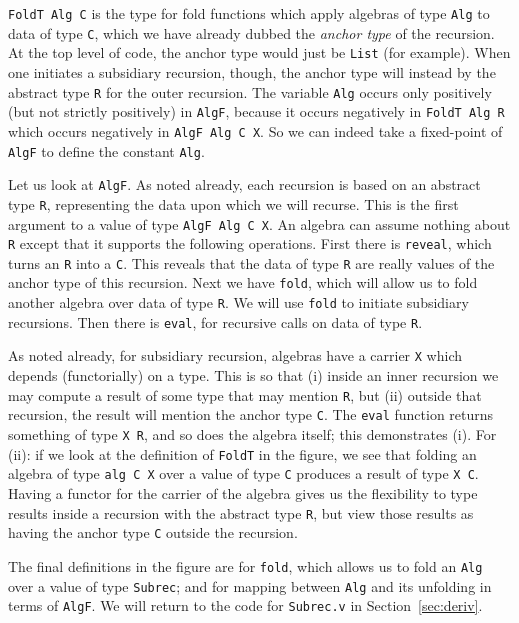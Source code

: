 \documentclass[a4paper,USenglish]{lipics-v2021}
\begin{document}
\verb|FoldT Alg C| is the type for fold functions which apply
algebras of type \verb|Alg| to data of type \verb|C|, which we have
already dubbed the \emph{anchor type} of the recursion.  At the top
level of code, the anchor type would just be \verb|List| (for
example).  When one initiates a subsidiary recursion, though, the
anchor type will instead by the abstract type \verb|R| for the outer recursion.
The variable \verb|Alg| occurs only positively (but not strictly
positively) in \verb|AlgF|, because it occurs negatively in
\verb|FoldT Alg R| which occurs negatively in \verb|AlgF Alg C X|.  So
we can indeed take a fixed-point of \verb|AlgF| to define the constant
\verb|Alg|.

Let us look at \verb|AlgF|.  As noted already, each recursion is based
on an abstract type \verb|R|, representing the data upon which we will
recurse.  This is the first argument to a value of type
\verb|AlgF Alg C X|.  An algebra can assume nothing about \verb|R|
except that it supports the following operations.  First there is
\verb|reveal|, which turns an \verb|R| into a \verb|C|.  This reveals
that the data of type \verb|R| are really values of the anchor type
of this recursion.  Next we have \texttt{fold}, which will allow us to fold
another algebra over data of type \verb|R|.  We will use \verb|fold|
to initiate subsidiary recursions.  Then there is \verb|eval|, for
recursive calls on data of type \verb|R|.

As noted already, for subsidiary recursion, algebras have a carrier
\verb|X| which depends (functorially) on a type.  This is so that (i)
inside an inner recursion we may compute a result of some type that
may mention \verb|R|, but (ii) outside that recursion, the result will
mention the anchor type \verb|C|.  The \verb|eval| function returns
something of type \verb|X R|, and so does the algebra itself; this
demonstrates (i).  For (ii): if we look at the definition of
\verb|FoldT| in the figure, we see that folding an algebra of type
\verb|alg C X| over a value of type \verb|C| produces a result of type
\verb|X C|.  Having a functor for the carrier of the algebra gives us
the flexibility to type results inside a recursion with the abstract
type \verb|R|, but view those results as having the anchor type
\verb|C| outside the recursion.

The final definitions in the figure are for \verb|fold|, which allows
us to fold an \verb|Alg| over a value of type \verb|Subrec|; and for mapping
between \verb|Alg| and its unfolding in terms of \verb|AlgF|.  We will
return to the code for \verb|Subrec.v| in Section~\ref{sec:deriv}.
\end{document}

